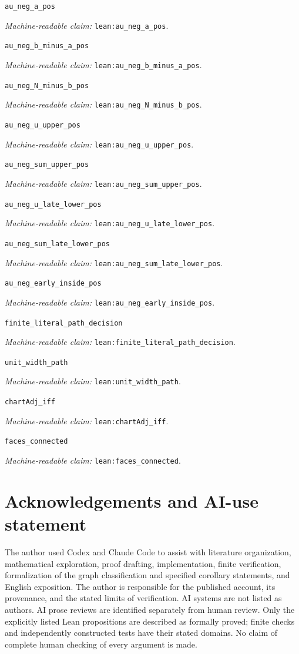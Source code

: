 \documentclass[11pt]{amsart}
\newcommand{\record}[1]{\nolinkurl{#1}}
\newcommand{\claimid}[1]{\par\nopagebreak\noindent\textit{Machine-readable claim:} \record{#1}.\par}
\begin{document}
\par\noindent\label{lean:au_neg_a_pos}\record{au_neg_a_pos}
\claimid{lean:au_neg_a_pos}
\par\noindent\label{lean:au_neg_b_minus_a_pos}\record{au_neg_b_minus_a_pos}
\claimid{lean:au_neg_b_minus_a_pos}
\par\noindent\label{lean:au_neg_N_minus_b_pos}\record{au_neg_N_minus_b_pos}
\claimid{lean:au_neg_N_minus_b_pos}
\par\noindent\label{lean:au_neg_u_upper_pos}\record{au_neg_u_upper_pos}
\claimid{lean:au_neg_u_upper_pos}
\par\noindent\label{lean:au_neg_sum_upper_pos}\record{au_neg_sum_upper_pos}
\claimid{lean:au_neg_sum_upper_pos}
\par\noindent\label{lean:au_neg_u_late_lower_pos}\record{au_neg_u_late_lower_pos}
\claimid{lean:au_neg_u_late_lower_pos}
\par\noindent\label{lean:au_neg_sum_late_lower_pos}\record{au_neg_sum_late_lower_pos}
\claimid{lean:au_neg_sum_late_lower_pos}
\par\noindent\label{lean:au_neg_early_inside_pos}\record{au_neg_early_inside_pos}
\claimid{lean:au_neg_early_inside_pos}
\par\noindent\label{lean:finite_literal_path_decision}\record{finite_literal_path_decision}
\claimid{lean:finite_literal_path_decision}

\par\noindent\label{lean:unit_width_path}\record{unit_width_path}
\claimid{lean:unit_width_path}
\par\noindent\label{lean:chartAdj_iff}\record{chartAdj_iff}
\claimid{lean:chartAdj_iff}
\par\noindent\label{lean:faces_connected}\record{faces_connected}
\claimid{lean:faces_connected}

\section*{Acknowledgements and AI-use statement}
The author used Codex and Claude Code
to assist with literature organization, mathematical exploration,
proof drafting, implementation, finite verification, formalization of
the graph classification and specified corollary statements, and English exposition. The author is responsible
for the published account, its provenance, and the stated limits of
verification. AI systems are not listed as authors. AI prose reviews
are identified separately from human review. Only the explicitly
listed Lean propositions are described as formally proved; finite
checks and independently constructed tests have their stated domains.
No claim of complete human checking of every argument is made.
\end{document}
